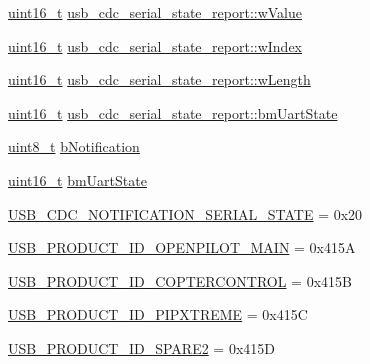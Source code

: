 \begin{DoxyCompactItemize}
\item 
\hyperlink{stdint_8h_a273cf69d639a59973b6019625df33e30}{uint16\-\_\-t} \hyperlink{group___p_i_o_s___u_s_b___d_e_f_s_ga6049498eadec3759d00a4063f911a58e}{usb\-\_\-cdc\-\_\-serial\-\_\-state\-\_\-report\-::w\-Value}
\item 
\hyperlink{stdint_8h_a273cf69d639a59973b6019625df33e30}{uint16\-\_\-t} \hyperlink{group___p_i_o_s___u_s_b___d_e_f_s_ga4246e449725cf89b5d38be3b9396a3ca}{usb\-\_\-cdc\-\_\-serial\-\_\-state\-\_\-report\-::w\-Index}
\item 
\hyperlink{stdint_8h_a273cf69d639a59973b6019625df33e30}{uint16\-\_\-t} \hyperlink{group___p_i_o_s___u_s_b___d_e_f_s_gaae61f52ac5f36605dd23f8a082ae609a}{usb\-\_\-cdc\-\_\-serial\-\_\-state\-\_\-report\-::w\-Length}
\item 
\hyperlink{stdint_8h_a273cf69d639a59973b6019625df33e30}{uint16\-\_\-t} \hyperlink{group___p_i_o_s___u_s_b___d_e_f_s_gad0e5711c1eafe5a6c8eeeed328cd58e5}{usb\-\_\-cdc\-\_\-serial\-\_\-state\-\_\-report\-::bm\-Uart\-State}
\item 
\hyperlink{stdint_8h_aba7bc1797add20fe3efdf37ced1182c5}{uint8\-\_\-t} \hyperlink{group___p_i_o_s___u_s_b___d_e_f_s_gaad103f9662f9e0805f460ca3ce27c5bb}{b\-Notification}
\item 
\hyperlink{stdint_8h_a273cf69d639a59973b6019625df33e30}{uint16\-\_\-t} \hyperlink{group___p_i_o_s___u_s_b___d_e_f_s_ga74589c60371f7e3893ef4e303a6ce2bc}{bm\-Uart\-State}
\item 
\hyperlink{group___p_i_o_s___u_s_b___d_e_f_s_gaf403cb181cb362069801308d723a0b53}{U\-S\-B\-\_\-\-C\-D\-C\-\_\-\-N\-O\-T\-I\-F\-I\-C\-A\-T\-I\-O\-N\-\_\-\-S\-E\-R\-I\-A\-L\-\_\-\-S\-T\-A\-T\-E} = 0x20
\item 
\hyperlink{group___p_i_o_s___u_s_b___d_e_f_s_gaf58de49e9aa6af1bd57862ef24b3f327}{U\-S\-B\-\_\-\-P\-R\-O\-D\-U\-C\-T\-\_\-\-I\-D\-\_\-\-O\-P\-E\-N\-P\-I\-L\-O\-T\-\_\-\-M\-A\-I\-N} = 0x415\-A
\item 
\hyperlink{group___p_i_o_s___u_s_b___d_e_f_s_ga5d389e4e4c3574fc6903cc6b27621c45}{U\-S\-B\-\_\-\-P\-R\-O\-D\-U\-C\-T\-\_\-\-I\-D\-\_\-\-C\-O\-P\-T\-E\-R\-C\-O\-N\-T\-R\-O\-L} = 0x415\-B
\item 
\hyperlink{group___p_i_o_s___u_s_b___d_e_f_s_ga3417d6241159fcb15428fc02a100caf9}{U\-S\-B\-\_\-\-P\-R\-O\-D\-U\-C\-T\-\_\-\-I\-D\-\_\-\-P\-I\-P\-X\-T\-R\-E\-M\-E} = 0x415\-C
\item 
\hyperlink{group___p_i_o_s___u_s_b___d_e_f_s_gacf4bcf402cb1c8ae5d1e953bd62acb3d}{U\-S\-B\-\_\-\-P\-R\-O\-D\-U\-C\-T\-\_\-\-I\-D\-\_\-\-S\-P\-A\-R\-E2} = 0x415\-D

\end{DoxyCompactItemize}
